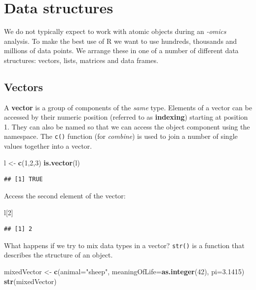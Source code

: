 \documentclass[a4paper]{book}
\newenvironment{Shaded}{\begin{snugshade}}{\end{snugshade}}
\newcommand{\KeywordTok}[1]{\textcolor[rgb]{0.13,0.29,0.53}{\textbf{{#1}}}}
\newcommand{\DataTypeTok}[1]{\textcolor[rgb]{0.13,0.29,0.53}{{#1}}}
\newcommand{\DecValTok}[1]{\textcolor[rgb]{0.00,0.00,0.81}{{#1}}}
\newcommand{\FloatTok}[1]{\textcolor[rgb]{0.00,0.00,0.81}{{#1}}}
\newcommand{\StringTok}[1]{\textcolor[rgb]{0.31,0.60,0.02}{{#1}}}
\newcommand{\NormalTok}[1]{{#1}}
\renewenvironment{Shaded}
{\vspace{1.5em}\begin{leftbar}\begin{snugshade}}
{\end{snugshade}\end{leftbar}\vspace{3pt}}
\begin{document}
\section{Data structures}\label{data-structures}

We do not typically expect to work with atomic objects during an
\emph{-omics} analysis. To make the best use of R we want to use
hundreds, thousands and millions of data points. We arrange these in one
of a number of different data structures: vectors, lists, matrices and
data frames.

\subsection{Vectors}\label{vectors}

A \textbf{vector} is a group of components of the \emph{same} type.
Elements of a vector can be accessed by their numeric position (referred
to as \textbf{indexing}) starting at position 1. They can also be named
so that we can access the object component using the namespace. The
\texttt{c()} function (for \emph{combine}) is used to join a number of
single values together into a vector.

\begin{Shaded}
\begin{Highlighting}[]
\NormalTok{l <-}\StringTok{ }\KeywordTok{c}\NormalTok{(}\DecValTok{1}\NormalTok{,}\DecValTok{2}\NormalTok{,}\DecValTok{3}\NormalTok{)}
\KeywordTok{is.vector}\NormalTok{(l)}
\end{Highlighting}
\end{Shaded}

\begin{verbatim}
## [1] TRUE
\end{verbatim}

Access the second element of the vector:

\begin{Shaded}
\begin{Highlighting}[]
\NormalTok{l[}\DecValTok{2}\NormalTok{]}
\end{Highlighting}
\end{Shaded}

\begin{verbatim}
## [1] 2
\end{verbatim}

What happens if we try to mix data types in a vector? \texttt{str()} is
a function that describes the structure of an object.

\begin{Shaded}
\begin{Highlighting}[]
\NormalTok{mixedVector <-}\StringTok{ }\KeywordTok{c}\NormalTok{(}\DataTypeTok{animal=}\StringTok{"sheep"}\NormalTok{, }\DataTypeTok{meaningOfLife=}\KeywordTok{as.integer}\NormalTok{(}\DecValTok{42}\NormalTok{), }\DataTypeTok{pi=}\FloatTok{3.1415}\NormalTok{)}
\KeywordTok{str}\NormalTok{(mixedVector)}
\end{Highlighting}
\end{Shaded}
\end{document}

